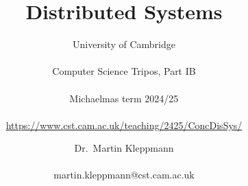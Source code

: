 
\newcommand{\coursepath}{/teaching/2425/ConcDisSys/}
\newcommand{\courseurl}{\url{https://www.cst.cam.ac.uk\coursepath}}
\newcommand{\thisyear}{2024/25}
\newcommand{\timestampexample}{2021-11-09T09:50:17+00:00}
\newcommand{\whenissecurity}{Part IB Easter term}
\newcommand{\whenisnetworking}{Part IB Lent term}
\newcommand{\networking}{https://www.cl.cam.ac.uk/teaching/2425/CompNet/}
\newcommand{\security}{https://www.cl.cam.ac.uk/teaching/2425/CySecurity/}
\newcommand{\ledgersystems}{https://www.cl.cam.ac.uk/teaching/2425/R47/}
\newcommand{\multicore}{https://www.cl.cam.ac.uk/teaching/2425/L304/}

\newcommand{\mydetails}{%
    $instructor_name$ \\\\
   $instructor_email$  \\\\[1em]
    University of Cambridge\\\\
    Computer Science Tripos, Part IB%
}



\title{Distributed Systems}
\subtitle{University of Cambridge\\\\%
Computer Science Tripos, Part IB\\\\%
Michaelmas term \thisyear\\\\%
\courseurl}

\author{Dr.\ Martin Kleppmann\\\\martin.kleppmann@cst.cam.ac.uk}
\date{}
\maketitle
\tableofcontents

